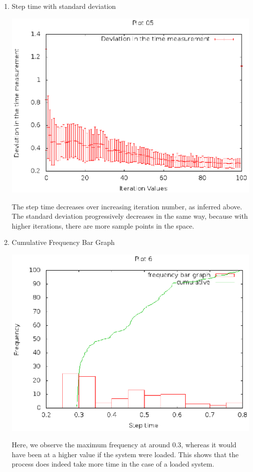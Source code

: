 \documentclass[a4paper,11pt]{article}
\begin{document}
\begin{enumerate}
  \item Step time with standard deviation
  \begin{center}
  \includegraphics{doc/g09_plot05.eps}
  \end{center}
  The step time decreases over increasing iteration number, as inferred above. The standard deviation progressively decreases in the same way, because with higher iterations, there are more sample points in the space.
  
  \item Cumulative Frequency Bar Graph
  \begin{center}
  \includegraphics{doc/g09_plot06.eps}
  \end{center}
  Here, we observe the maximum frequency at around 0.3, whereas it would have been at a higher value if the system were loaded. This shows that the process does indeed take more time in the case of a loaded system.
\end{enumerate}
\end{document}
